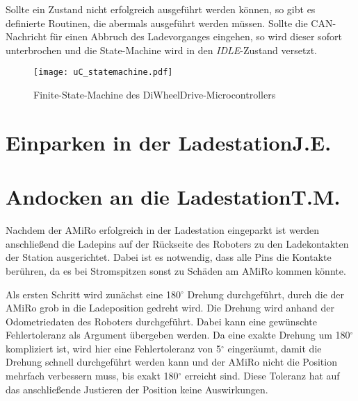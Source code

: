 Sollte ein Zustand nicht erfolgreich ausgeführt werden können, so gibt es definierte Routinen, die abermals ausgeführt werden müssen. Sollte die CAN-Nachricht für einen Abbruch des Ladevorganges eingehen, so wird dieser sofort unterbrochen und die State-Machine wird in den \textit{IDLE}-Zustand versetzt.

\begin{figure}[H]
	\begin{center}
		\texttt{[image: uC\_statemachine.pdf]} 	
		\caption{Finite-State-Machine des DiWheelDrive-Microcontrollers}
		\label{fig:uC_statmachine}
	\end{center}
\end{figure}

\section[Einparken in der Ladestation]{Einparken in der Ladestation\hfill {\normalsize J.E.}}\label{kap:einparken_ladestation} %

\section[Andocken an die Ladestation]{Andocken an die Ladestation\hfill {\normalsize T.M.}}\label{kap:andocken_ladestation} %
Nachdem der AMiRo erfolgreich in der Ladestation eingeparkt ist werden anschließend die Ladepins auf der Rückseite des Roboters zu den Ladekontakten der Station ausgerichtet. Dabei ist es notwendig, dass alle Pins die Kontakte berühren, da es bei Stromspitzen sonst zu Schäden am AMiRo kommen könnte.

Als ersten Schritt wird zunächst eine 180$^\circ$ Drehung durchgeführt, durch die der AMiRo grob in die Ladeposition gedreht wird. Die Drehung wird anhand der Odometriedaten des Roboters durchgeführt. Dabei kann eine gewünschte Fehlertoleranz als Argument übergeben werden. Da eine exakte Drehung um 180$^\circ$ kompliziert ist, wird hier eine Fehlertoleranz von 5$^\circ$ eingeräumt, damit die Drehung schnell durchgeführt werden kann und der AMiRo nicht die Position mehrfach verbessern muss, bis exakt 180$^\circ$ erreicht sind. Diese Toleranz hat auf das anschließende Justieren der Position keine Auswirkungen.

